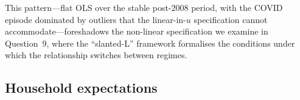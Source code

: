 \documentclass[dvipsnames,11pt]{article}
\begin{document}
\begin{enumerate}
\begin{solution}
                    This pattern---flat OLS over the stable post-2008 period, with the COVID episode dominated by outliers that the linear-in-$u$ specification cannot accommodate---foreshadows the non-linear specification we examine in Question~9, where the \textcite{benigno2024slanted} ``slanted-L'' framework formalises the conditions under which the relationship switches between regimes.
                    
                \end{solution}
            
        \end{enumerate}

    \subsection{Household expectations}
    
\end{document}
